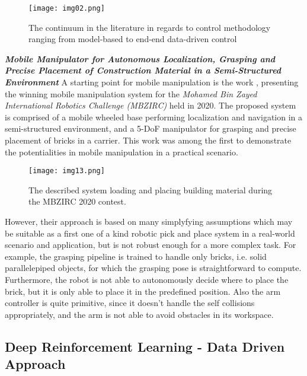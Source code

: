 \begin{figure}[H]
	\centering
	\texttt{[image: img02.png]}
	\captionsetup{width=0.6\linewidth}
	\caption{The continuum in the literature in regards to control
		methodology ranging from model-based to end-end data-driven
		control \cite{thakar2023survey}}
	\label{fig:img02}
\end{figure}


\textbf{\textit{Mobile Manipulator for Autonomous Localization,
Grasping and Precise Placement of Construction
Material in a Semi-Structured Environment}} \quad
A starting point for mobile manipulation is the work \cite{loianno2021construction},
presenting the winning mobile manipulation system for the \textit{Mohamed
Bin Zayed International Robotics Challenge (MBZIRC)} held in 2020. The proposed system
is comprised of a mobile wheeled base performing localization and navigation in a
semi-structured environment, and a 5-DoF manipulator for grasping and precise placement
of bricks in a carrier. This work was among the first to demonstrate the potentialities
in mobile manipulation in a practical scenario.

\begin{figure}[H]
	\centering
	\texttt{[image: img13.png]}
	\captionsetup{width=1\linewidth}
	\caption{The described system loading and placing building material
	during the MBZIRC 2020 contest.	\cite{loianno2021construction}}
	\label{fig:img13}
\end{figure}

However, their approach is based on many simplyfying assumptions which may be suitable as a
first one of a kind robotic pick and place system in a real-world scenario and application,
but is not robust enough for a more complex task. For example, the grasping pipeline
is trained to handle only bricks, i.e. solid parallelepiped objects, for which the grasping pose
is straightforward to compute. Furthermore, the robot is not able to autonomously decide
where to place the brick, but it is only able to place it in the predefined position.
Also the arm controller is quite primitive, since it doesn't handle the self collisions
appropriately, and the arm is not able to avoid obstacles in its workspace.

\subsection{Deep Reinforcement Learning - Data Driven Approach}

